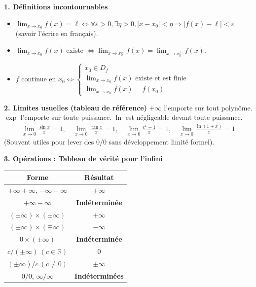 \documentclass[11pt]{article}
\begin{document}
\begin{aretenir}
\textbf{1. Définitions incontournables}
\begin{itemize}
  \item $\lim_{x\to x_0}f(x)=\ell \iff \forall \varepsilon>0, \exists \eta>0, |x-x_0|<\eta \Rightarrow |f(x)-\ell|<\varepsilon$ (savoir l'écrire en français).
  \item $\lim_{x\to x_0}f(x)$ existe $\iff \lim_{x\to x_0^-}f(x)=\lim_{x\to x_0^+}f(x)$.
  \item $f$ continue en $x_0 \iff \begin{cases} x_0\in D_f \\ \lim_{x\to x_0}f(x) \text{ existe et est finie} \\ \lim_{x\to x_0}f(x)=f(x_0) \end{cases}$
\end{itemize}

\textbf{2. Limites usuelles (tableau de référence)}
$+\infty$ l'emporte sur tout polynôme. $\exp$ l'emporte sur toute puissance. $\ln$ est négligeable devant toute puissance.
\begin{align*}
\lim_{x\to 0}\frac{\sin x}{x}=1,\quad \lim_{x\to 0}\frac{\tan x}{x}=1,\quad \lim_{x\to 0}\frac{e^x-1}{x}=1,\quad \lim_{x\to 0}\frac{\ln(1+x)}{x}=1
\end{align*}
(Souvent utiles pour lever des $0/0$ sans développement limité formel).

\textbf{3. Opérations : Tableau de vérité pour l'infini}
\begin{center}
\begin{tabular}{|c|c|}
\hline
\rowcolor{popblueL} \textbf{Forme} & \textbf{Résultat} \\
\hline
$+\infty+\infty$, $-\infty-\infty$ & $\pm\infty$ \\
$+\infty-\infty$ & \textbf{Indéterminée} \\
$(\pm\infty)\times(\pm\infty)$ & $+\infty$ \\
$(\pm\infty)\times(\mp\infty)$ & $-\infty$ \\
$0\times(\pm\infty)$ & \textbf{Indéterminée} \\
$c/(\pm\infty)\ (c\in\mathbb{R})$ & $0$ \\
$(\pm\infty)/c\ (c\neq 0)$ & $\pm\infty$ \\
$0/0$, $\infty/\infty$ & \textbf{Indéterminées} \\
\hline
\end{tabular}
\end{center}


\end{aretenir}
\end{document}
